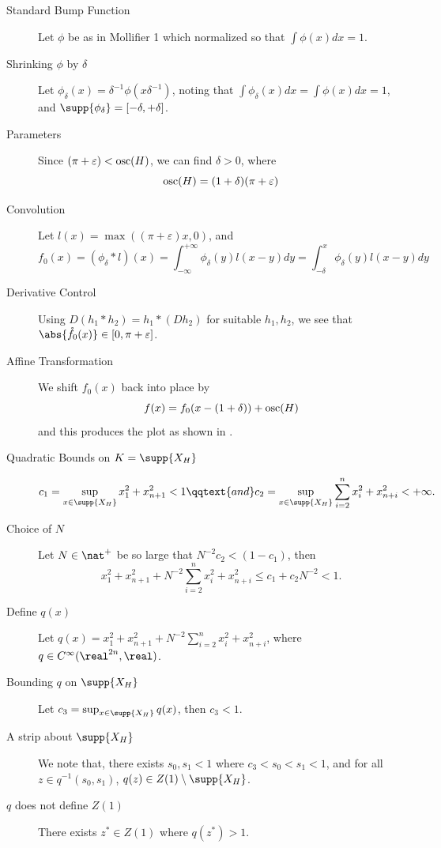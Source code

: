 \documentclass[../main-v2-manifolds.tex]{subfiles}
\begin{document}
\begin{description}
    \item[Standard Bump Function] Let $\phi$ be as in Mollifier 1 which normalized so that $\int\phi(x)dx = 1$.
    \item[Shrinking $\phi$ by $\delta$] Let $\phi_\delta(x) = \delta^{-1}\phi(x\delta^{-1})$, noting that $\int\phi_\delta(x)dx = \int\phi(x)dx = 1$, and $\supp{\phi_\delta} = [-\delta,+\delta]$.
    \item[Parameters] Since $(\pi + \varepsilon)<\mathrm{osc}(H)$, we can find $\delta>0$, where
    \[
        \mathrm{osc}(H) = (1+\delta)(\pi+\varepsilon)
    \]
    \item[Convolution] Let $l(x) = \max((\pi + \varepsilon)x,0)$, and 
    \[
        f_0(x) = (\phi_\delta\ast l)(x)=\int_{-\infty}^{+\infty}\phi_{\delta}(y)l(x-y)dy=\int_{-\delta}^x \phi_\delta(y)l(x-y)dy
    \]
    \item[Derivative Control] Using $D(h_1\ast h_2) = h_1\ast (D h_2)$ for suitable $h_1, h_2$, we see that $\abs{\mathring{f}_0(x)}\in[0,\pi+\varepsilon]$.
    \item[Affine Transformation] We shift $f_0(x)$ back into place by
    \[
        f(x) = f_0(x-(1+\delta)) + \mathrm{osc}(H)
    \]
    and this produces the plot as shown in .
\end{description}
\begin{description}
    \item[Quadratic Bounds on $K = \supp{X_H}$]
    \[
    c_1 = \sup_{x\in \supp{X_H}} x_1^2 + x_{n+1}^2 < 1\qqtext{and} c_2 = \sup_{x\in\supp{X_H}} \sum_{i=2}^n x_i^2 + x_{n+i}^2 < +\infty.
    \]
    \item[Choice of $N$]
    Let $N\in\nat^+$ be so large that $N^{-2}c_2<(1-c_1)$, then
    \[
        x_1^2 + x_{n+1}^2 + N^{-2}\sum_{i=2}^n x_i^2 + x_{n+i}^2 \leq c_1 + c_2N^{-2}<1.
    \]
    \item[Define $q(x)$]
    Let $q(x) = x_1^2 + x_{n+1}^2 + N^{-2}\sum_{i=2}^n x_i^2 + x_{n+i}^2$, where $q\in C^\infty(\realtn,\real)$.
    \item[Bounding $q$ on $\supp{X_H}$]
    Let $c_3 = \sup_{x\in \supp{X_H}}q(x)$, then $c_3 < 1$.
    \item[A strip about $\supp{X_H}$]
    We note that, there exists $s_0,s_1<1$ where $c_3<s_0<s_1<1$, and for all $z\in q^{-1}(s_0,s_1)$, $q(z)\in Z(1)\setminus \supp{X_H}$.
    \item[$q$ does not define $Z(1)$]
    There exists $z^*\in Z(1)$ where $q(z^*) > 1$. 
\end{description}
\end{document}
